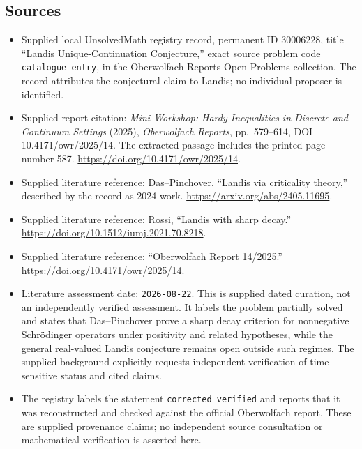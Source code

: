 \documentclass[11pt]{article}
\begin{document}
\subsection{Sources}
\begin{itemize}
\item Supplied local UnsolvedMath registry record, permanent ID \(30006228\), title ``Landis Unique-Continuation Conjecture,'' exact source problem code \texttt{catalogue entry}, in the Oberwolfach Reports Open Problems collection. The record attributes the conjectural claim to Landis; no individual proposer is identified.
\item Supplied report citation: \emph{Mini-Workshop: Hardy Inequalities in Discrete and Continuum Settings} (2025), \emph{Oberwolfach Reports}, pp.\ 579--614, DOI 10.4171/owr/2025/14. The extracted passage includes the printed page number 587. \url{https://doi.org/10.4171/owr/2025/14}.
\item Supplied literature reference: Das--Pinchover, ``Landis via criticality theory,'' described by the record as 2024 work. \url{https://arxiv.org/abs/2405.11695}.
\item Supplied literature reference: Rossi, ``Landis with sharp decay.'' \url{https://doi.org/10.1512/iumj.2021.70.8218}.
\item Supplied literature reference: ``Oberwolfach Report 14/2025.'' \url{https://doi.org/10.4171/owr/2025/14}.
\item Literature assessment date: \texttt{2026-08-22}. This is supplied dated curation, not an independently verified assessment. It labels the problem partially solved and states that Das--Pinchover prove a sharp decay criterion for nonnegative Schr\"odinger operators under positivity and related hypotheses, while the general real-valued Landis conjecture remains open outside such regimes. The supplied background explicitly requests independent verification of time-sensitive status and cited claims.
\item The registry labels the statement \texttt{corrected\_verified} and reports that it was reconstructed and checked against the official Oberwolfach report. These are supplied provenance claims; no independent source consultation or mathematical verification is asserted here.
\end{itemize}
\end{document}
